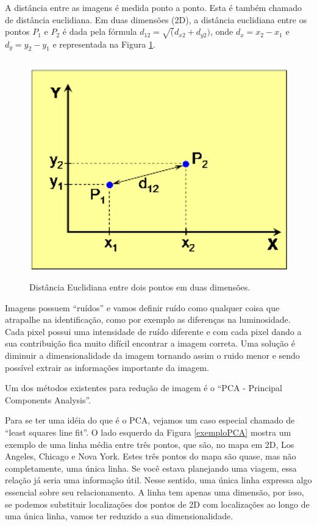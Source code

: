 A distância entre as imagens é medida ponto a ponto. Esta é também chamado de distância euclidiana. Em duas dimensões (2D), a distância euclidiana entre os pontos $P_1$ e $P_2$ é dada pela fórmula $\displaystyle d_{12} = \sqrt(d_{x2} + d_{y2})$, onde $\displaystyle d_x = x_2 - x_1$ e $\displaystyle d_y = y_2-y_1$ e representada na Figura \ref{distanciaEntrePontos}.

    \begin{figure}[hbt]
		\begin{center}
			\includegraphics[height=9.5cm,width=12.5cm]{figuras/2.FundamentacaoTeorica/graficoDistanciaEntrePontos.png}
		\end{center}
		\caption{Distância Euclidiana entre dois pontos em duas dimensões.}
		\label{distanciaEntrePontos}
	\end{figure}


Imagens possuem ``ruídos'' e vamos definir ruído como qualquer coisa que atrapalhe na identificação, como por exemplo as diferenças na luminosidade. Cada pixel possui uma intensidade de ruído diferente e com cada pixel dando a sua contribuição fica muito difícil encontrar a imagem correta. Uma solução é diminuir a dimensionalidade da imagem tornando assim o ruido menor e sendo possível extrair as informações importante da imagem.

Um dos métodos existentes para redução de imagem é o ``PCA - Principal Components Analysis''.

Para se ter uma idéia do que é o PCA, vejamos um caso especial chamado de ``least squares line fit''. O lado esquerdo da Figura \ref{exemploPCA} mostra um exemplo de uma linha média entre três pontos, que são, no mapa em 2D, Los Angeles, Chicago e Nova York. Estes três pontos do mapa são quase, mas não completamente, uma única linha. Se você estava planejando uma viagem, essa relação já seria uma informação útil. Nesse sentido, uma única linha expressa algo essencial sobre seu relacionamento. A linha tem apenas uma dimensão, por isso, se podemos substituir localizações dos pontos de 2D com localizações ao longo de uma única linha, vamos ter reduzido a sua dimensionalidade.

